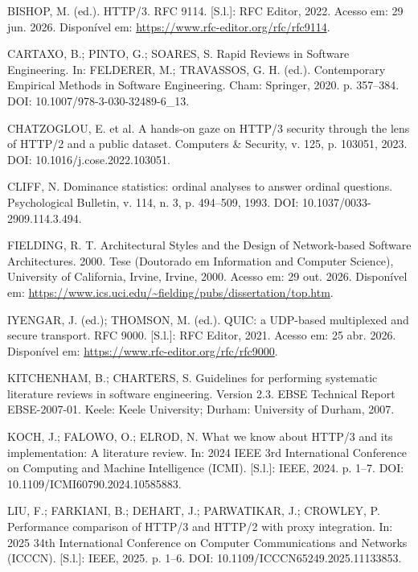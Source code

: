 ﻿BISHOP, M. (ed.). HTTP/3. RFC 9114. [S.l.]: RFC Editor, 2022. Acesso em: 29 jun. 2026. Disponível em: \url{https://www.rfc-editor.org/rfc/rfc9114}.



CARTAXO, B.; PINTO, G.; SOARES, S. Rapid Reviews in Software Engineering. In: FELDERER, M.; TRAVASSOS, G. H. (ed.). Contemporary Empirical Methods in Software Engineering. Cham: Springer, 2020. p. 357--384. DOI: 10.1007/978-3-030-32489-6\_13.



CHATZOGLOU, E. et al. A hands-on gaze on HTTP/3 security through the lens of HTTP/2 and a public dataset. Computers \& Security, v. 125, p. 103051, 2023. DOI: 10.1016/j.cose.2022.103051.



CLIFF, N. Dominance statistics: ordinal analyses to answer ordinal questions. Psychological Bulletin, v. 114, n. 3, p. 494--509, 1993. DOI: 10.1037/0033-2909.114.3.494.



FIELDING, R. T. Architectural Styles and the Design of Network-based Software Architectures. 2000. Tese (Doutorado em Information and Computer Science), University of California, Irvine, Irvine, 2000. Acesso em: 29 out. 2026. Disponível em: \url{https://www.ics.uci.edu/~fielding/pubs/dissertation/top.htm}.



IYENGAR, J. (ed.); THOMSON, M. (ed.). QUIC: a UDP-based multiplexed and secure transport. RFC 9000. [S.l.]: RFC Editor, 2021. Acesso em: 25 abr. 2026. Disponível em: \url{https://www.rfc-editor.org/rfc/rfc9000}.



KITCHENHAM, B.; CHARTERS, S. Guidelines for performing systematic literature reviews in software engineering. Version 2.3. EBSE Technical Report EBSE-2007-01. Keele: Keele University; Durham: University of Durham, 2007.



KOCH, J.; FALOWO, O.; ELROD, N. What we know about HTTP/3 and its implementation: A literature review. In: 2024 IEEE 3rd International Conference on Computing and Machine Intelligence (ICMI). [S.l.]: IEEE, 2024. p. 1--7. DOI: 10.1109/ICMI60790.2024.10585883.



LIU, F.; FARKIANI, B.; DEHART, J.; PARWATIKAR, J.; CROWLEY, P. Performance comparison of HTTP/3 and HTTP/2 with proxy integration. In: 2025 34th International Conference on Computer Communications and Networks (ICCCN). [S.l.]: IEEE, 2025. p. 1--6. DOI: 10.1109/ICCCN65249.2025.11133853.



